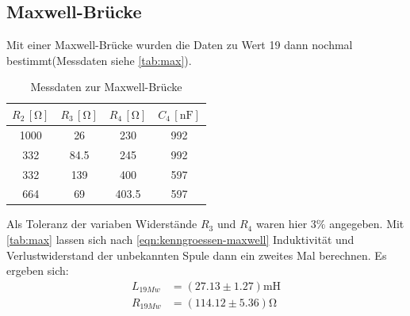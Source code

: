 \subsection{Maxwell-Brücke}
Mit einer Maxwell-Brücke wurden die Daten zu Wert 19 dann nochmal bestimmt(Messdaten siehe \autoref{tab:max}). 
\begin{table}
  \centering
  \caption{Messdaten zur Maxwell-Brücke}
  \label{tab:max}
  \begin{tabular}{c c c c}
  \toprule
  $R_2 \, [\si{\ohm}]$ &$R_3 \, [\si{\ohm}]$ &$R_4 \, [\si{\ohm}]$&$C_4 \, [\si{\nano} \si{\farad}]$\\
  \midrule
  1000 & 26 & 230 & 992\\
  332  & 84.5 & 245 & 992\\
  332 & 139 & 400 & 597\\
  664 & 69 & 403.5 & 597\\
  \bottomrule
  \end{tabular}
\end{table}
Als Toleranz der variaben Widerstände $R_3$ und $R_4$ waren hier $3\%$ angegeben.
Mit  \autoref{tab:max} lassen sich nach \autoref{eqn:kenngroessen-maxwell} Induktivität und Verlustwiderstand der unbekannten Spule dann ein zweites Mal berechnen. Es ergeben sich:
\begin{align}
  L_{19Mw}&=(27.13 \pm 1.27)\si{\milli} \si{\henry}\\
  R_{19Mw}&=(114.12 \pm 5.36)\si{\ohm}
\end{align}


